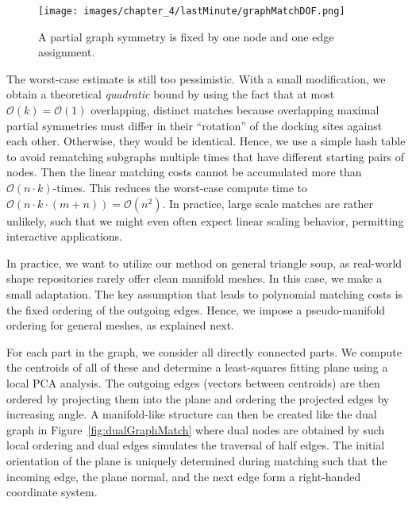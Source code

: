 \begin{figure}[t!]
	\centering
		\texttt{[image: images/chapter\_4/lastMinute/graphMatchDOF.png]}
	\caption[Partial graph symmetry.]{A partial graph symmetry is fixed by one node and one edge assignment.}
	\label{fig:graphMatchDOF}
\end{figure}

The worst-case estimate is still too pessimistic. With a small modification, we obtain a theoretical \emph{quadratic} bound by using the fact that at most $\mathcal{O}(k)=\mathcal{O}(1)$ overlapping, distinct matches because overlapping maximal partial symmetries must differ in their ``rotation'' of the docking sites against each other. Otherwise, they would be identical. Hence, we use a simple hash table to avoid rematching subgraphs multiple times that have different starting pairs of nodes. Then the linear matching costs cannot be accumulated more than $\mathcal{O}(n \cdot k)$-times. This reduces the worst-case compute time to $\mathcal{O}(n \cdot k \cdot (m+n)) = \mathcal{O}(n^2)$. In practice, large scale matches are rather unlikely, such that we might even often expect linear scaling behavior, permitting interactive applications.

In practice, we want to utilize our method on general triangle soup, as real-world shape repositories rarely offer clean manifold meshes. In this case, we make a small adaptation. The key assumption that leads to polynomial matching costs is the fixed ordering of the outgoing edges. %
 Hence, we impose a pseudo-manifold ordering for general meshes, as explained next.

For each part in the graph, we consider all directly connected parts. We compute the centroids of all of these and determine a least-squares fitting plane using a local PCA analysis. The outgoing edges (vectors between centroids) are then ordered by projecting them into the plane and ordering the projected edges by increasing angle. A manifold-like structure can then be created like the dual graph in Figure~\ref{fig:dualGraphMatch} where dual nodes are obtained by such local ordering and dual edges simulates the traversal of half edges. The initial orientation of the plane is uniquely determined during matching such that the incoming edge, the plane normal, and the next edge %
form a right-handed coordinate system. %

